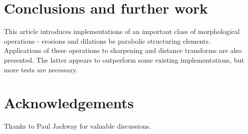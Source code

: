 \documentclass{InsightArticle}
\begin{document}
\section{Conclusions and further work}
This article introduces implementations of an important class of
morphological operations - erosions and dilations be parabolic
structuring elements. Applications of these operations to sharpening
and distance transforms are also presented. The latter appears to
outperform some existing implementations, but more tests are
necessary.

\section*{Acknowledgements}
Thanks to Paul Jackway for valuable discussions.



\nocite{ITKSoftwareGuide}
\end{document}
